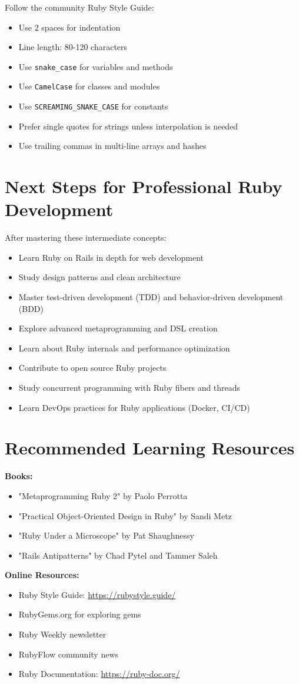 \documentclass[12pt,a4paper]{article}
\begin{document}
Follow the community Ruby Style Guide:

\begin{itemize}
    \item Use 2 spaces for indentation
    \item Line length: 80-120 characters
    \item Use \texttt{snake\_case} for variables and methods
    \item Use \texttt{CamelCase} for classes and modules
    \item Use \texttt{SCREAMING\_SNAKE\_CASE} for constants
    \item Prefer single quotes for strings unless interpolation is needed
    \item Use trailing commas in multi-line arrays and hashes
\end{itemize}

\section{Next Steps for Professional Ruby Development}

After mastering these intermediate concepts:

\begin{itemize}
    \item Learn Ruby on Rails in depth for web development
    \item Study design patterns and clean architecture
    \item Master test-driven development (TDD) and behavior-driven development (BDD)
    \item Explore advanced metaprogramming and DSL creation
    \item Learn about Ruby internals and performance optimization
    \item Contribute to open source Ruby projects
    \item Study concurrent programming with Ruby fibers and threads
    \item Learn DevOps practices for Ruby applications (Docker, CI/CD)
\end{itemize}

\section{Recommended Learning Resources}

\textbf{Books:}
\begin{itemize}
    \item "Metaprogramming Ruby 2" by Paolo Perrotta
    \item "Practical Object-Oriented Design in Ruby" by Sandi Metz
    \item "Ruby Under a Microscope" by Pat Shaughnessy
    \item "Rails Antipatterns" by Chad Pytel and Tammer Saleh
\end{itemize}

\textbf{Online Resources:}
\begin{itemize}
    \item Ruby Style Guide: \url{https://rubystyle.guide/}
    \item RubyGems.org for exploring gems
    \item Ruby Weekly newsletter
    \item RubyFlow community news
    \item Ruby Documentation: \url{https://ruby-doc.org/}
\end{itemize}
\end{document}
